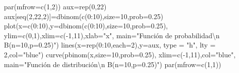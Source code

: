 \documentclass[
  letterpaper,
  DIV=11,
  numbers=noendperiod]{scrreprt}
\newenvironment{Shaded}{\begin{snugshade}}{\end{snugshade}}
\newcommand{\AttributeTok}[1]{\textcolor[rgb]{0.40,0.45,0.13}{#1}}
\newcommand{\DecValTok}[1]{\textcolor[rgb]{0.68,0.00,0.00}{#1}}
\newcommand{\FloatTok}[1]{\textcolor[rgb]{0.68,0.00,0.00}{#1}}
\newcommand{\FunctionTok}[1]{\textcolor[rgb]{0.28,0.35,0.67}{#1}}
\newcommand{\NormalTok}[1]{\textcolor[rgb]{0.00,0.23,0.31}{#1}}
\newcommand{\OtherTok}[1]{\textcolor[rgb]{0.00,0.23,0.31}{#1}}
\newcommand{\SpecialCharTok}[1]{\textcolor[rgb]{0.37,0.37,0.37}{#1}}
\newcommand{\StringTok}[1]{\textcolor[rgb]{0.13,0.47,0.30}{#1}}
\begin{document}
\begin{Shaded}
\begin{Highlighting}[]
\FunctionTok{par}\NormalTok{(}\AttributeTok{mfrow=}\FunctionTok{c}\NormalTok{(}\DecValTok{1}\NormalTok{,}\DecValTok{2}\NormalTok{))}
\NormalTok{aux}\OtherTok{=}\FunctionTok{rep}\NormalTok{(}\DecValTok{0}\NormalTok{,}\DecValTok{22}\NormalTok{)}
\NormalTok{aux[}\FunctionTok{seq}\NormalTok{(}\DecValTok{2}\NormalTok{,}\DecValTok{22}\NormalTok{,}\DecValTok{2}\NormalTok{)]}\OtherTok{=}\FunctionTok{dbinom}\NormalTok{(}\FunctionTok{c}\NormalTok{(}\DecValTok{0}\SpecialCharTok{:}\DecValTok{10}\NormalTok{),}\AttributeTok{size=}\DecValTok{10}\NormalTok{,}\AttributeTok{prob=}\FloatTok{0.25}\NormalTok{)}
\FunctionTok{plot}\NormalTok{(}\AttributeTok{x=}\FunctionTok{c}\NormalTok{(}\DecValTok{0}\SpecialCharTok{:}\DecValTok{10}\NormalTok{),}\AttributeTok{y=}\FunctionTok{dbinom}\NormalTok{(}\FunctionTok{c}\NormalTok{(}\DecValTok{0}\SpecialCharTok{:}\DecValTok{10}\NormalTok{),}\AttributeTok{size=}\DecValTok{10}\NormalTok{,}\AttributeTok{prob=}\FloatTok{0.25}\NormalTok{),}
  \AttributeTok{ylim=}\FunctionTok{c}\NormalTok{(}\DecValTok{0}\NormalTok{,}\DecValTok{1}\NormalTok{),}\AttributeTok{xlim=}\FunctionTok{c}\NormalTok{(}\SpecialCharTok{{-}}\DecValTok{1}\NormalTok{,}\DecValTok{11}\NormalTok{),}\AttributeTok{xlab=}\StringTok{"x"}\NormalTok{,}
  \AttributeTok{main=}\StringTok{"Función de probabilidad}\SpecialCharTok{\textbackslash{}n}\StringTok{ B(n=10,p=0.25)"}\NormalTok{)}
\FunctionTok{lines}\NormalTok{(}\AttributeTok{x=}\FunctionTok{rep}\NormalTok{(}\DecValTok{0}\SpecialCharTok{:}\DecValTok{10}\NormalTok{,}\AttributeTok{each=}\DecValTok{2}\NormalTok{),}\AttributeTok{y=}\NormalTok{aux, }\AttributeTok{type =} \StringTok{"h"}\NormalTok{, }\AttributeTok{lty =} \DecValTok{2}\NormalTok{,}\AttributeTok{col=}\StringTok{"blue"}\NormalTok{)}
\FunctionTok{curve}\NormalTok{(}\FunctionTok{pbinom}\NormalTok{(x,}\AttributeTok{size=}\DecValTok{10}\NormalTok{,}\AttributeTok{prob=}\FloatTok{0.25}\NormalTok{),}
  \AttributeTok{xlim=}\FunctionTok{c}\NormalTok{(}\SpecialCharTok{{-}}\DecValTok{1}\NormalTok{,}\DecValTok{11}\NormalTok{),}\AttributeTok{col=}\StringTok{"blue"}\NormalTok{,}
  \AttributeTok{main=}\StringTok{"Función de distribución}\SpecialCharTok{\textbackslash{}n}\StringTok{ B(n=10,p=0.25)"}\NormalTok{)}
\FunctionTok{par}\NormalTok{(}\AttributeTok{mfrow=}\FunctionTok{c}\NormalTok{(}\DecValTok{1}\NormalTok{,}\DecValTok{1}\NormalTok{))}
\end{Highlighting}
\end{Shaded}
\end{document}
